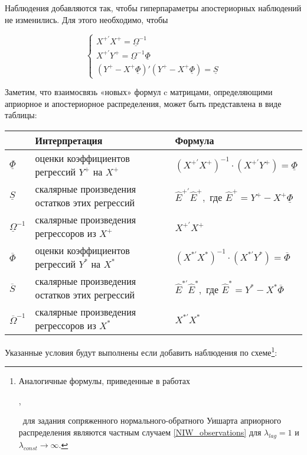 \documentclass[11pt]{article} %
\newcommand{\prior}{\underline}
\newcommand{\post}{\overline}
\newcommand{\eng}[1]{\begin{otherlanguage}{english}#1\end{otherlanguage}}
\begin{document}
Наблюдения добавляются так, чтобы гиперпараметры апостериорных наблюдений не изменились. Для этого необходимо, чтобы

\begin{equation}
\begin{cases}
X^{+\prime}X^+=\prior \Omega^{-1} \\
X^{+\prime}Y^+=\prior \Omega^{-1}\prior \Phi \\
(Y^+-X^+\prior \Phi)'(Y^+-X^+ \prior \Phi) = \prior S
\end{cases}
\end{equation}

Заметим, что взаимосвязь «новых» формул  c матрицами, определяющими априорное и апостериорное распределения, может быть представлена в виде таблицы:

\begin{center}
\begin{table}[h!]
\begin{tabular}{lll}
\toprule
& Интерпретация& Формула\\
\midrule
 $\prior \Phi$ & оценки коэффициентов регрессий $Y^+$ на $X^+$&
 $(X^{+\prime}X^+)^{-1}\cdot (X^{+\prime}Y^+)= \prior \Phi$ \\
$\prior S$ &скалярные произведения остатков этих регрессий&
$\hat E^{+\prime} \hat E^+, \text{ где } \hat E^+=Y^+-X^+\prior \Phi
$\\
$\prior \Omega^{-1}$ & скалярные произведения регрессоров из $X^+$&
$X^{+\prime}X^+$\\
\midrule
$\post \Phi$ & оценки коэффициентов регрессий  $Y^*$ на $X^*$&
$(X^{*\prime}X^*)^{-1}\cdot (X^{*\prime}Y^*)= \post \Phi$\\
$\post S$ & скалярные произведения остатков этих регрессий&
$\hat E^{*\prime} \hat E^*, \text{ где } \hat E^*=Y^*-X^*\post\Phi$\\
$\post \Omega^{-1}$ &скалярные произведения регрессоров из $X^*$&
$X^{*\prime}X^*$\\
\bottomrule

\end{tabular}
\end{table}
\end{center}


Указанные условия будут выполнены если добавить наблюдения по схеме\footnote{Аналогичные формулы, приведенные в работах \eng{\cite{banbura_al_2010}}, \eng{\cite{berg_henzel_2013}}~для задания сопряженного нормального-обратного Уишарта априорного распределения являются частным случаем \eqref{NIW_observations} для $\lambda_{lag}=1$ и $\lambda_{const}\to\infty$.}:
\end{document}
